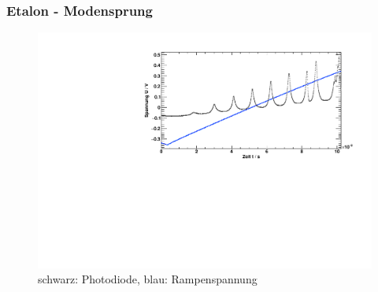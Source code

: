 \begin{frame}
\frametitle{Etalon - Modensprung}
\begin{figure}[H]
    \begin{center}
        \includegraphics[width=\textwidth]{../img/up-etalon_zoom.pdf}
        \caption{schwarz: Photodiode, blau: Rampenspannung}
    \end{center}
\end{figure}
\end{frame}
